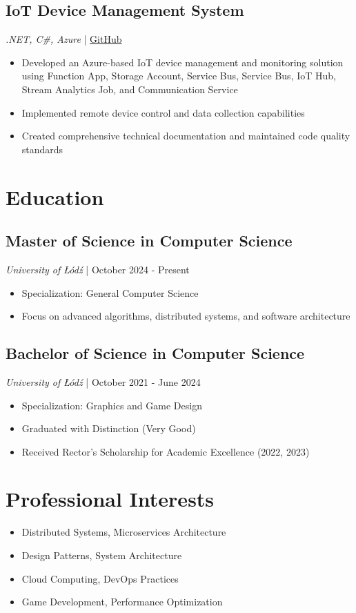 \documentclass[a4paper,10pt]{article}
\begin{document}
\subsection{IoT Device Management System}
\textit{.NET, C\#, Azure} | \href{https://github.com/ZDSDD/IoT_OpcAgent}{GitHub}
\begin{itemize}[leftmargin=0.5cm, nosep]
    \item Developed an Azure-based IoT device management and monitoring solution using Function App, Storage Account, Service Bus, Service Bus, IoT Hub, Stream Analytics Job, and Communication Service
    \item Implemented remote device control and data collection capabilities
    \item Created comprehensive technical documentation and maintained code quality standards
\end{itemize}


\section{Education}

\subsection{Master of Science in Computer Science}
\textit{University of Łódź} | October 2024 - Present
\begin{itemize}[leftmargin=0.5cm, nosep]
    \item Specialization: General Computer Science
    \item Focus on advanced algorithms, distributed systems, and software architecture
\end{itemize}

\subsection{Bachelor of Science in Computer Science}
\textit{University of Łódź} | October 2021 - June 2024
\begin{itemize}[leftmargin=0.5cm, nosep]
    \item Specialization: Graphics and Game Design
    \item Graduated with Distinction (Very Good)
    \item Received Rector's Scholarship for Academic Excellence (2022, 2023)
\end{itemize}

\section{Professional Interests}
\begin{itemize}[leftmargin=0.5cm, nosep]
    \item Distributed Systems, Microservices Architecture
    \item Design Patterns, System Architecture
    \item Cloud Computing, DevOps Practices
    \item Game Development, Performance Optimization
\end{itemize}
\end{document}
